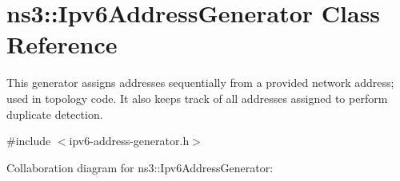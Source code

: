 \hypertarget{classns3_1_1Ipv6AddressGenerator}{}\section{ns3\+:\+:Ipv6\+Address\+Generator Class Reference}
\label{classns3_1_1Ipv6AddressGenerator}


This generator assigns addresses sequentially from a provided network address; used in topology code. It also keeps track of all addresses assigned to perform duplicate detection.  




{\ttfamily \#include $<$ipv6-\/address-\/generator.\+h$>$}



Collaboration diagram for ns3\+:\+:Ipv6\+Address\+Generator\+:
